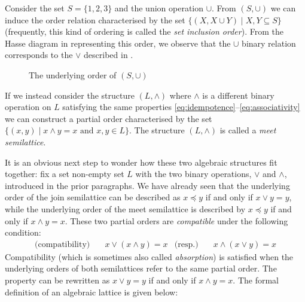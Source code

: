 \begin{example}
     Consider the set $S = \{1,2,3\}$ and the union operation $\cup$. From $(S, \cup)$ we can induce the order relation characterised by the set $\{(X, X \cup Y) \mid X,Y \subseteq S \}$ (frequently, this kind of ordering is called the \textit{set inclusion order}). From the Hasse diagram in  representing this order, we observe that the $\cup$ binary relation corresponds to the $\vee$ described in .
%
\begin{figure}[H]
  \centering
  \caption{The underlying order of $(S, \cup)$}
  \label{figure:set-inclusion-order}
\end{figure}
\end{example}

If we instead consider the structure $(L, \wedge)$ where $\wedge$ is a different binary operation on $L$ satisfying the same properties \cref{eq:idempotence}--\cref{eq:associativity} we can construct a partial order characterised by the set $\{(x,y) \mid x \wedge y = x \text{ and } x,y \in L\}$. The structure $(L, \wedge)$ is called a \textit{meet semilattice}.

It is an obvious next step to wonder how these two algebraic structures fit together: fix a set non-empty set $L$ with the two binary operations, $\vee$ and $\wedge$, introduced in the prior paragraphs. We have already seen that the underlying order of the join semilattice can be described as $x \preceq y$ if and only if $x \vee y = y$, while the underlying order of the meet semilattice is described by $x \preceq y$ if and only if $x \wedge y = x$. These two partial orders are \textit{compatible} under the following condition:
\begin{align}
     \text{(compatibility)} & \quad x \vee (x \wedge y) = x & \text{(resp.)}  & \quad x \wedge (x \vee y) = x
\end{align}
%
Compatibility (which is sometimes also called \textit{absorption}) is satisfied when the underlying orders of both semilattices refer to the same partial order. The property can be rewritten as $x \vee y = y$ if and only if $x \wedge y = x$. The formal definition of an algebraic lattice is given below:

